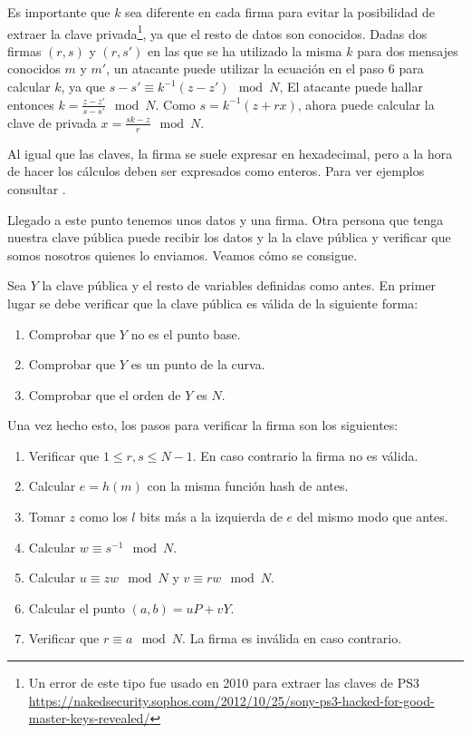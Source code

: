 \documentclass[twoside]{article}
\theoremstyle{definition}
\begin{document}
Es importante que $k$ sea diferente en cada firma para evitar la posibilidad de extraer la clave privada\footnote{Un error de este tipo fue usado en 2010 para extraer las claves de PS3 \url{https://nakedsecurity.sophos.com/2012/10/25/sony-ps3-hacked-for-good-master-keys-revealed/}}, ya que el resto de datos son conocidos. Dadas dos firmas $(r,s)$ y $(r,s')$ en las que se ha utilizado la misma $k$ para dos mensajes conocidos $m$ y $m'$, un atacante puede utilizar la ecuación en el paso 6 para calcular $k$, ya que $s-s'\equiv k^{-1}(z-z')\mod N$, El atacante puede hallar entonces $k=\frac{z-z'}{s-s'}\mod N$. Como $s=k^{-1}(z+rx)$, ahora puede calcular la clave de privada $x=\frac{sk-z}{r}\mod N$. 

Al igual que las claves, la firma se suele expresar en hexadecimal, pero a la hora de hacer los cálculos deben ser expresados como enteros. Para ver ejemplos consultar \cite{Eric}.

Llegado a este punto tenemos unos datos y una firma. Otra persona que tenga nuestra clave pública puede recibir los datos y la la clave pública y verificar que somos nosotros quienes lo enviamos. Veamos cómo se consigue.

Sea $Y$ la clave pública y el resto de variables definidas como antes. En primer lugar se debe verificar que la clave pública es válida de la siguiente forma:
\begin{enumerate}
\item Comprobar que $Y$ no es el punto base.
\item Comprobar que $Y$ es un punto de la curva.
\item Comprobar que el orden de $Y$ es $N$.
\end{enumerate}
Una vez hecho esto, los pasos para verificar la firma son los siguientes: 
\begin{enumerate}
\item Verificar que $1\leq r,s\leq N-1$. En caso contrario la firma no es válida.
\item Calcular $e=h(m)$ con la misma función hash de antes.
\item Tomar $z$ como los $l$ bits más a la izquierda de $e$ del mismo modo que antes.
\item Calcular $w\equiv s^{-1}\mod N$.
\item Calcular $u\equiv zw\mod N$ y $v\equiv rw\mod N$. 
\item Calcular el punto $(a,b)=uP+vY$.
\item Verificar que $r\equiv a\mod N$. La firma es inválida en caso contrario.
\end{enumerate}
\end{document}
